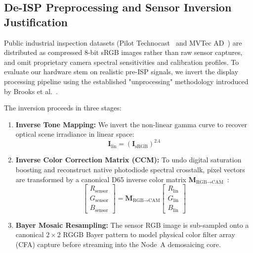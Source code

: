\documentclass[conference]{IEEEtran}
\begin{document}
\subsection{De-ISP Preprocessing and Sensor Inversion Justification}
\label{sec:deisp}
Public industrial inspection datasets (Pilot Technocast~\cite{pilot2020casting} and MVTec AD~\cite{bergmann2019mvtec}) are distributed as compressed 8-bit sRGB images rather than raw sensor captures, and omit proprietary camera spectral sensitivities and calibration profiles. To evaluate our hardware stem on realistic pre-ISP signals, we invert the display processing pipeline using the established "unprocessing" methodology introduced by Brooks et al.~\cite{brooks2019unprocessing}.

The inversion proceeds in three stages:
\begin{enumerate}
    \item \textbf{Inverse Tone Mapping:} We invert the non-linear gamma curve to recover optical scene irradiance in linear space:
    \begin{equation}
    \mathbf{I}_{\text{lin}} = (\mathbf{I}_{\text{sRGB}})^{2.4}
    \end{equation}
    \item \textbf{Inverse Color Correction Matrix (CCM):} To undo digital saturation boosting and reconstruct native photodiode spectral crosstalk, pixel vectors are transformed by a canonical D65 inverse color matrix $\mathbf{M}_{\text{RGB}\to\text{CAM}}$~\cite{brooks2019unprocessing}:
    \begin{equation}
    \begin{bmatrix} R_{\text{sensor}} \\ G_{\text{sensor}} \\ B_{\text{sensor}} \end{bmatrix} = \mathbf{M}_{\text{RGB}\to\text{CAM}} \begin{bmatrix} R_{\text{lin}} \\ G_{\text{lin}} \\ B_{\text{lin}} \end{bmatrix}
    \end{equation}
    \item \textbf{Bayer Mosaic Resampling:} The sensor RGB image is sub-sampled onto a canonical $2\times2$ RGGB Bayer pattern to model physical color filter array (CFA) capture before streaming into the Node~A demosaicing core.
\end{enumerate}
\end{document}
